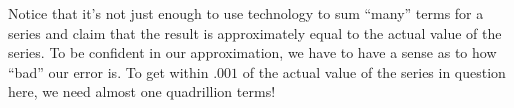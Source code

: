 \documentclass{ximera}
\begin{document}
\begin{exercise}
\begin{exercise}
\begin{hint}
\end{hint}

\begin{feedback}
Notice that it's not just enough to use technology to sum ``many'' terms for a series and claim that the result is approximately equal to the actual value of the series.  To be confident in our approximation, we have to have a sense as to how ``bad'' our error is.  To get within $.001$ of the actual value of the series in question here, we need almost one quadrillion terms!  
\end{feedback}
\end{exercise}
\end{exercise}
\end{document}
